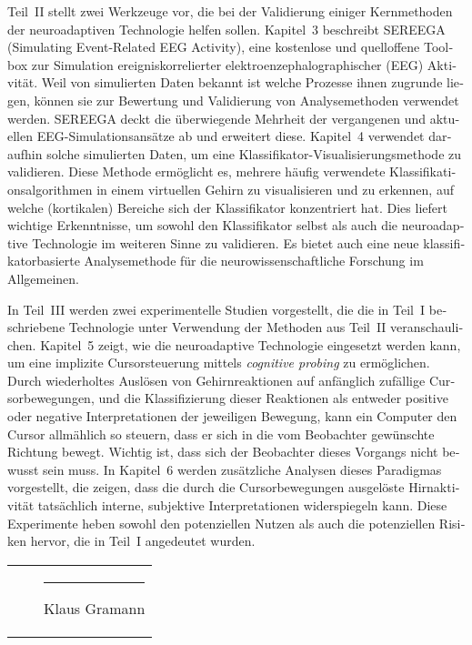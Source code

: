 \documentclass[a4paper,11pt]{article}
\begin{document}
\begin{otherlanguage}{ngerman}
Teil~II stellt zwei Werkzeuge vor, die bei der Validierung einiger Kernmethoden der neuroadaptiven Technologie helfen sollen. Kapitel~3 beschreibt SEREEGA (Simulating Event-Related EEG Activity), eine kostenlose und quelloffene Toolbox zur Simulation ereigniskorrelierter elektroenzephalographischer (EEG) Aktivität. Weil von simulierten Daten bekannt ist welche Prozesse ihnen zugrunde liegen, können sie zur Bewertung und Validierung von Analysemethoden verwendet werden. SEREEGA deckt die überwiegende Mehrheit der vergangenen und aktuellen EEG-Simulationsansätze ab und erweitert diese. Kapitel~4 verwendet daraufhin solche simulierten Daten, um eine Klassifikator-Visualisierungsmethode zu validieren. Diese Methode ermöglicht es, mehrere häufig verwendete Klassifikationsalgorithmen in einem virtuellen Gehirn zu visualisieren und zu erkennen, auf welche (kortikalen) Bereiche sich der Klassifikator konzentriert hat. Dies liefert wichtige Erkenntnisse, um sowohl den Klassifikator selbst als auch die neuroadaptive Technologie im weiteren Sinne zu validieren. Es bietet auch eine neue klassifikatorbasierte Analysemethode für die neurowissenschaftliche Forschung im Allgemeinen.

In Teil~III werden zwei experimentelle Studien vorgestellt, die die in Teil~I beschriebene Technologie unter Verwendung der Methoden aus Teil~II veranschaulichen. Kapitel~5 zeigt, wie die neuroadaptive Technologie eingesetzt werden kann, um eine implizite Cursorsteuerung mittels \emph{cognitive probing} zu ermöglichen. Durch wiederholtes Auslösen von Gehirnreaktionen auf anfänglich zufällige Cursorbewegungen, und die Klassifizierung dieser Reaktionen als entweder positive oder negative Interpretationen der jeweiligen Bewegung, kann ein Computer den Cursor allmählich so steuern, dass er sich in die vom Beobachter gewünschte Richtung bewegt. Wichtig ist, dass sich der Beobachter dieses Vorgangs nicht bewusst sein muss. In Kapitel~6 werden zusätzliche Analysen dieses Paradigmas vorgestellt, die zeigen, dass die durch die Cursorbewegungen ausgelöste Hirnaktivität tatsächlich interne, subjektive Interpretationen widerspiegeln kann. Diese Experimente heben sowohl den potenziellen Nutzen als auch die potenziellen Risiken hervor, die in Teil~I angedeutet wurden.
\end{otherlanguage}

\vfill

\begin{tabularx}{\textwidth}{XXX}
& & \hrule Klaus Gramann \\
\end{tabularx}

\vspace{5cm}
\end{document}
